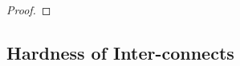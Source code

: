\begin{proof}
%
  


%  
\end{proof}



\subsection{Hardness of Inter-connects}\label{ssec:fprscc}


